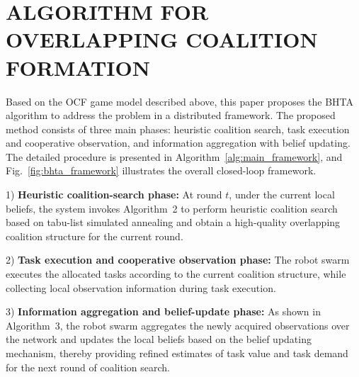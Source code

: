 \documentclass[journal,twoside,web]{ieeecolor}
\begin{document}
\section{ALGORITHM FOR OVERLAPPING COALITION FORMATION}
Based on the OCF game model described above, this paper proposes the BHTA algorithm to address the problem in a distributed framework. The proposed method consists of three main phases: heuristic coalition search, task execution and cooperative observation, and information aggregation with belief updating. The detailed procedure is presented in Algorithm~\ref{alg:main_framework}, and Fig.~\ref{fig:bhta_framework} illustrates the overall closed-loop framework.

1) \textbf{Heuristic coalition-search phase:} At round $t$, under the current local beliefs, the system invokes Algorithm~2 to perform heuristic coalition search based on tabu-list simulated annealing and obtain a high-quality overlapping coalition structure for the current round.

2) \textbf{Task execution and cooperative observation phase:} The robot swarm executes the allocated tasks according to the current coalition structure, while collecting local observation information during task execution.

3) \textbf{Information aggregation and belief-update phase:} As shown in Algorithm~3, the robot swarm aggregates the newly acquired observations over the network and updates the local beliefs based on the belief updating mechanism, thereby providing refined estimates of task value and task demand for the next round of coalition search.
\end{document}
